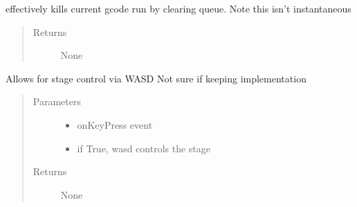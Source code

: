 \documentclass[letterpaper,10pt,english]{sphinxmanual}
\begin{document}
\begin{fulllineitems}
\begin{fulllineitems}
\begin{quote}
\begin{description}
\end{description}\end{quote}

\end{fulllineitems}


\begin{fulllineitems}
\label{\detokenize{index:droogCNC.TwoAxisStage.killSwitch}}
\sphinxAtStartPar
effectively kills current gcode run by clearing queue. Note this isn’t instantaneous
\begin{quote}\begin{description}
\item[{Returns}] \leavevmode
\sphinxAtStartPar
None

\end{description}\end{quote}

\end{fulllineitems}


\begin{fulllineitems}
\label{\detokenize{index:droogCNC.TwoAxisStage.onKeyPress}}
\sphinxAtStartPar
Allows for stage control via WASD \sphinxhyphen{} Not sure if keeping implementation
\begin{quote}\begin{description}
\item[{Parameters}] \leavevmode\begin{itemize}
\item {} 
\sphinxAtStartPar
{} \textendash{} onKeyPress event

\item {} 
\sphinxAtStartPar
{} \textendash{} if True, wasd controls the stage

\end{itemize}

\item[{Returns}] \leavevmode
\sphinxAtStartPar
None


\end{description}
\end{quote}
\end{fulllineitems}
\end{fulllineitems}
\end{document}
